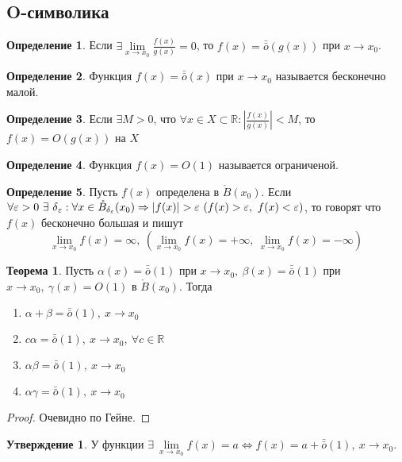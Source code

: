 \documentclass[a4paper, 12pt]{article}
\newcommand{\R}{\mathbb{R}}
\newcommand{\Bo}{\mathring{B}}
\renewcommand{\epsilon}{\varepsilon}
\newcommand{\om}{\bar{\bar{o}}}
\theoremstyle{definition}
\newtheorem*{definition}{Определение}
\newtheorem*{theorem}{Теорема}
\newtheorem*{statement}{Утверждение}
\begin{document}
    \subsection{O-символика}
        \begin{definition}
            Если $\exists \lim\limits_{x\to x_0}\frac{f(x)}{g(x)}=0$, то $f(x)=\om(g(x))$ при $x\to x_0$.
        \end{definition} 
        \begin{definition}
            Функция $f(x)=\om(x)$ при $x\to x_0$ называется бесконечно малой.
        \end{definition}
        \begin{definition}
            Если $\exists M>0$, что $\forall x\in X\subset \R: |\frac{f(x)}{g(x)}|<M$, то $f(x)=O(g(x))$ на $X$
        \end{definition} 
        \begin{definition}
            Функция $f(x)=O(1)$ называется ограниченой.
        \end{definition}
        \begin{definition}
            Пусть $f(x)$ определена в $\Bo(x_0)$. Если $\forall \epsilon>0\ \exists\ \delta{_\epsilon}:\\
            \forall x\in \Bo_{\delta_{\epsilon}}(x_0) \Rightarrow |f(x)|>\epsilon\ (f(x)>\epsilon,\ f(x)<\epsilon)$, то говорят что $f(x)$ бесконечно большая и пишут
            \[\lim\limits_{x\to x_0}f(x)=\infty,\ (\lim\limits_{x\to x_0}f(x)=+\infty,\ \lim\limits_{x\to x_0}f(x)=-\infty)\]
        \end{definition}
        \begin{theorem}
            Пусть $\alpha(x)=\om(1)$ при $x\to x_0,\ \beta(x)=\om(1)$ при $x\to x_0,\ \gamma(x)=O(1)$ в $\Bo(x_0)$. Тогда
            \begin{enumerate}
                \item $\alpha+\beta=\om(1),\ x\to x_0$
                \item $c \alpha=\om(1),\ x\to x_0,\ \forall c\in \R$
                \item $\alpha\beta=\om(1),\ x\to x_0$
                \item $\alpha\gamma=\om(1),\ x\to x_0$
            \end{enumerate}
        \end{theorem} 
        \begin{proof}
            Очевидно по Гейне.
        \end{proof} 
        \begin{statement}
            У функции $\exists\ \lim\limits_{x\to x_0}f(x)=a\Leftrightarrow f(x)=a+\om(1),\ x\to x_0$.
        \end{statement} 
\end{document}
